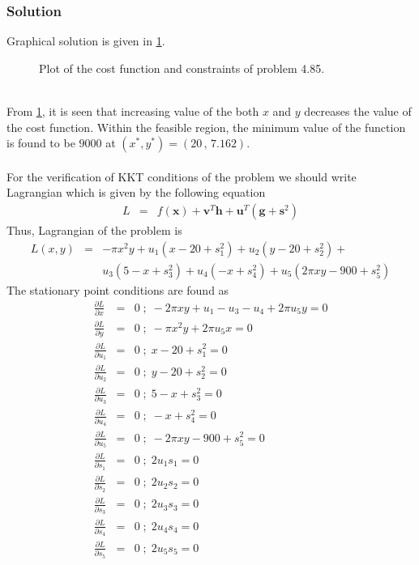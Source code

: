 \documentclass[]{report}
\begin{document}
\subsubsection{Solution}
Graphical solution is given in \cref{fig:problem485}.
\begin{figure}[ht!]

\caption{Plot of the cost function and constraints of problem 4.85.}
\label{fig:problem485}
\end{figure}
\\
From \cref{fig:problem485}, it is seen that increasing value of the both $x$ and $y$ decreases the value of the cost function. Within the feasible region, the minimum value of the function is found to be $9000$ at $\left(x^*,y^*\right)=\left(20\, ,\,  7.162\right)$.
\\~
\\
For the verification of KKT conditions of the problem we should write Lagrangian which is given by the following equation
\begin{eqnarray*}
L &=&f\left(\mathbf x\right) + \mathbf{v}^T\mathbf{h}+\mathbf{u}^T\left(\mathbf{g}+\mathbf{s}^2\right)
\end{eqnarray*}
Thus, Lagrangian of the problem is 
\begin{eqnarray*}
L \left(x,y\right) &=&-\pi x^2 y+u_1\left(x-20+s_1^2\right)+u_2\left(y-20+s_2^2\right)+\\
&& u_3\left(5-x+s_3^2\right)+u_4\left(-x+s_4^2\right)+u_5\left(2\pi x y -900+s_5^2\right)
\end{eqnarray*}
The stationary point conditions are found as
\begin{eqnarray*}
\frac{\partial L}{\partial x}&=& 0 \; ; \; -2 \pi x y +u_1-u_3-u_4+2\pi u_5 y=0
\\ \frac{\partial L}{\partial y}&=& 0 \; ; \; - \pi x^2 y +2\pi u_5x=0
\\
\frac{\partial L}{\partial u_1}&=& 0 \; ; \; x-20+s_1^2=0
\\
\frac{\partial L}{\partial u_2}&=& 0 \; ; \; y-20+s_2^2=0
\\
\frac{\partial L}{\partial u_3}&=& 0 \; ; \; 5-x+s_3^2=0
\\
\frac{\partial L}{\partial u_4}&=& 0 \; ; \; -x+s_4^2=0
\\
\frac{\partial L}{\partial u_5}&=& 0 \; ; \; -2 \pi x y -900+s_5^2=0
\\
\frac{\partial L}{\partial s_1}&=& 0 \; ; \; 2 u_1 s_1=0
\\
\frac{\partial L}{\partial s_2}&=& 0 \; ; \; 2 u_2 s_2=0
\\
\frac{\partial L}{\partial s_3}&=& 0 \; ; \; 2 u_3 s_3=0
\\
\frac{\partial L}{\partial s_4}&=& 0 \; ; \; 2 u_4 s_4=0
\\
\frac{\partial L}{\partial s_5}&=& 0 \; ; \; 2 u_5 s_5=0
\end{eqnarray*}
\end{document}
